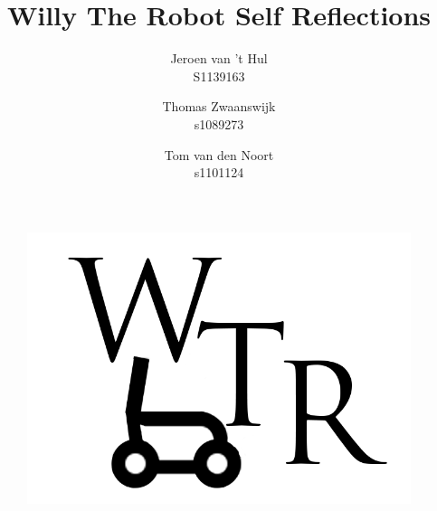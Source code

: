 \documentclass{article} %
\title{\huge Willy The Robot Self Reflections}
\author{Jeroen van 't Hul\\S1139163  \and Thomas Zwaanswijk\\s1089273 \and Tom van den Noort\\s1101124}
\date{\parbox{\linewidth}{\centering%
	\today\endgraf\bigskip
	Supervisor \hspace*{3cm}	Main Stakeholder\endgraf\medskip
	Mischa Mol \hspace*{3cm} Ilja Clabbers\endgraf\medskip
	Windesheim Zwolle\endgraf}}
\begin{document}
\maketitle

\begin{figure}[H]
\centering
\includegraphics[width=12 cm]{WTRLogo.png}
\end{figure}
\thispagestyle{empty}
\newpage
\setcounter{page}{1}
\tableofcontents
\newpage





\newpage
\end{document}
